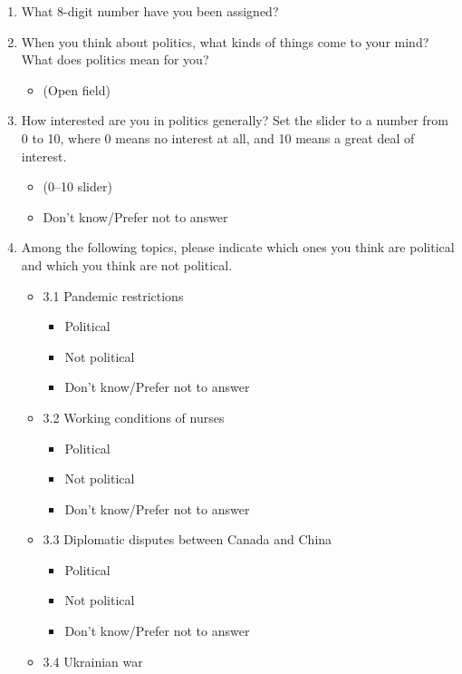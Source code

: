 \documentclass[
  letterpaper,
  DIV=11,
  numbers=noendperiod]{scrreprt}
\providecommand{\tightlist}{%
  \setlength{\itemsep}{0pt}\setlength{\parskip}{0pt}}\usepackage{longtable,booktabs,array}
\begin{document}
\begin{enumerate}
\def\labelenumi{\arabic{enumi}.}
\setcounter{enumi}{-1}
\item
  What 8-digit number have you been assigned?
\item
  When you think about politics, what kinds of things come to your mind?
  What does politics mean for you?

  \begin{itemize}
  \tightlist
  \item
    (Open field)
  \end{itemize}
\item
  How interested are you in politics generally? Set the slider to a
  number from 0 to 10, where 0 means no interest at all, and 10 means a
  great deal of interest.

  \begin{itemize}
  \tightlist
  \item
    (0--10 slider)
  \item
    Don't know/Prefer not to answer
  \end{itemize}
\item
  Among the following topics, please indicate which ones you think are
  political and which you think are not political.

  \begin{itemize}
  \tightlist
  \item
    3.1 Pandemic restrictions

    \begin{itemize}
    \tightlist
    \item
      Political
    \item
      Not political
    \item
      Don't know/Prefer not to answer
    \end{itemize}
  \item
    3.2 Working conditions of nurses

    \begin{itemize}
    \tightlist
    \item
      Political
    \item
      Not political
    \item
      Don't know/Prefer not to answer
    \end{itemize}
  \item
    3.3 Diplomatic disputes between Canada and China

    \begin{itemize}
    \tightlist
    \item
      Political
    \item
      Not political
    \item
      Don't know/Prefer not to answer
    \end{itemize}
  \item
    3.4 Ukrainian war


\end{itemize}
\end{enumerate}
\end{document}

